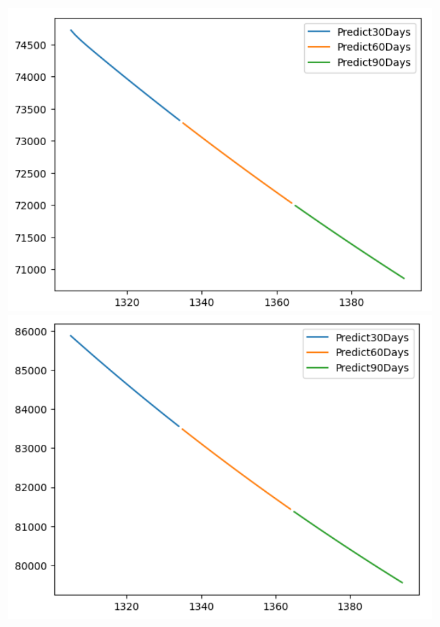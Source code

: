 \begin{figure}[H]
\begin{minipage}{0.15\textwidth}
    \includegraphics[width=1\textwidth]{resources/chapter-5/newdata1/predicted/VCB_VARMA_8-2_30days.png}
    \end{minipage}
    \hfill
        \begin{minipage}{0.15\textwidth}
    \centering
    \includegraphics[width=1\textwidth]{resources/chapter-5/newdata1/predicted/VCB_VARMA_9-1_30days.png}
    \end{minipage}
    \hfill
    \begin{minipage}{0.15\textwidth}
    \centering

\end{minipage}
\end{figure}
